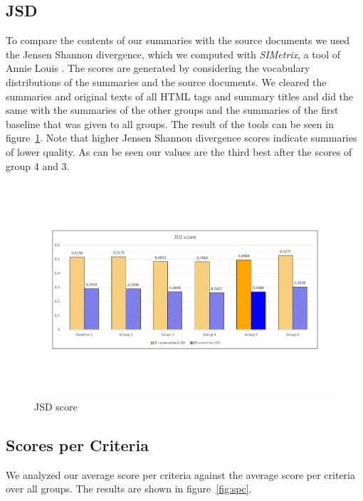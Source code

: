 \subsection{JSD}
To compare the contents of our summaries with the source documents we used the
Jensen Shannon divergence, which we computed with \textit{SIMetrix}, a tool of
Annie Louis \citep{louis}. The scores are generated by considering the vocabulary
distributions of the summaries and the source documents. We cleared the summaries
and original texts of all HTML tags and summary titles and did the same
with the summaries of the other groups and the summaries of the first baseline
that was given to all groups. The result of the tools can be seen in
figure~\ref{fig:jsd}. Note that higher Jensen Shannon divergence scores indicate
summaries of lower quality. As can be seen our values are the third best after
the scores of group 4 and 3.
\begin{figure}[H]
	\centering
	\includegraphics[trim=0 150 0 150, width=\textwidth]{img/jsd.pdf}
	\caption{JSD score}
	\label{fig:jsd}
\end{figure}


\subsection{Scores per Criteria}

We analyzed our average score per criteria against the average score per criteria over all groups. The results are shown in figure~\ref{fig:spc}.

